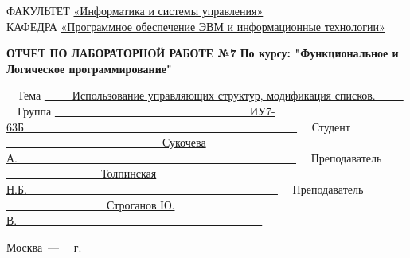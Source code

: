 \begin{titlepage}
{	{\doublespacing \small \raggedright ФАКУЛЬТЕТ \hspace{5mm} \underline{«Информатика и системы управления»}\\
	КАФЕДРА \hspace{10mm} \underline{«Программное обеспечение ЭВМ и информационные технологии»}\\}

	\vspace{20mm}

	\begin{center}
		\noindent\begin{minipage}{1.2\textwidth}\centering
			\textbf{ОТЧЕТ ПО ЛАБОРАТОРНОЙ РАБОТЕ №7}\newline
			\textbf{По курсу: "Функциональное и Логическое программирование"}\newline\newline\newline
		\end{minipage}
	\end{center}

	\vspace{20mm}

	\noindent ~~Тема \underline{~~~~~Использование управляющих структур, модификация списков.~~~~~}\newline
	\noindent ~~Группа \underline{~~~~~~~~~~~~~~~~~~~~~~~~~~~~~~~~~~~ИУ7-63Б~~~~~~~~~~~~~~~~~~~~~~~~~~~~~~~~~~~~~~~~~~~~~~~~~}\newline
	\noindent ~~Студент \underline{~~~~~~~~~~~~~~~~~~~~~~~~~~~~Сукочева А.~~~~~~~~~~~~~~~~~~~~~~~~~~~~~~~~~~~~~~~~~~~~~~~~~~}\newline
	\noindent ~~Преподаватель \underline{~~~~~~~~~~~~~~~~~Толпинская Н.Б.~~~~~~~~~~~~~~~~~~~~~~~~~~~~~~~~~~~~~~~~~~~~~}\newline
	\noindent ~~Преподаватель \underline{~~~~~~~~~~~~~~~~~~Строганов Ю. В.~~~~~~~~~~~~~~~~~~~~~~~~~~~~~~~~~~~~~~~~~~~~}\newline


	\begin{center}
		\vfill
		Москва~---~\the\year
		~г.
	\end{center}
	}



\end{titlepage}

\setcounter{page}{2}